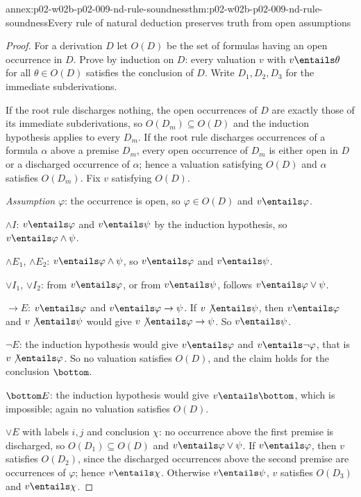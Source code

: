 \begin{annexitem}{annex:p02-w02b-p02-009-nd-rule-soundness}{thm:p02-w02b-p02-009-nd-rule-soundness}{Every rule of natural deduction preserves truth from open assumptions}
\begin{proof}
For a derivation \(D\) let \(O(D)\) be the set of formulas having an open
occurrence in \(D\).  Prove by induction on \(D\): every valuation \(v\) with
\(v\entails\theta\) for all \(\theta\in O(D)\) satisfies the conclusion of
\(D\).  Write \(D_1,D_2,D_3\) for the immediate subderivations.

If the root rule discharges nothing, the open occurrences of \(D\) are
exactly those of its immediate subderivations, so \(O(D_m)\subseteq O(D)\)
and the induction hypothesis applies to every \(D_m\).  If the root rule
discharges occurrences of a formula \(\alpha\) above a premise \(D_m\), every
open occurrence of \(D_m\) is either open in \(D\) or a discharged occurrence
of \(\alpha\); hence a valuation satisfying \(O(D)\) and \(\alpha\) satisfies
\(O(D_m)\).  Fix \(v\) satisfying \(O(D)\).

\emph{Assumption} \(\varphi\): the occurrence is open, so
\(\varphi\in O(D)\) and \(v\entails\varphi\).

\(\land I\): \(v\entails\varphi\) and \(v\entails\psi\) by the induction
hypothesis, so \(v\entails\varphi\land\psi\).

\(\land E_1\), \(\land E_2\): \(v\entails\varphi\land\psi\), so
\(v\entails\varphi\) and \(v\entails\psi\).

\(\lor I_1\), \(\lor I_2\): from \(v\entails\varphi\), or from
\(v\entails\psi\), follows \(v\entails\varphi\lor\psi\).

\(\to E\): \(v\entails\varphi\) and \(v\entails\varphi\to\psi\).  If
\(v\not\entails\psi\), then \(v\entails\varphi\) and \(v\not\entails\psi\)
would give \(v\not\entails\varphi\to\psi\).  So \(v\entails\psi\).

\(\neg E\): the induction hypothesis would give \(v\entails\varphi\) and
\(v\entails\neg\varphi\), that is \(v\not\entails\varphi\).  So no
valuation satisfies \(O(D)\), and the claim holds for the conclusion
\(\bottom\).

\(\bottom E\): the induction hypothesis would give \(v\entails\bottom\),
which is impossible; again no valuation satisfies \(O(D)\).

\(\lor E\) with labels \(i,j\) and conclusion \(\chi\): no occurrence above
the first premise is discharged, so \(O(D_1)\subseteq O(D)\) and
\(v\entails\varphi\lor\psi\).  If \(v\entails\varphi\), then \(v\) satisfies
\(O(D_2)\), since the discharged occurrences above the second premise are
occurrences of \(\varphi\); hence \(v\entails\chi\).  Otherwise
\(v\entails\psi\), \(v\) satisfies \(O(D_3)\) and \(v\entails\chi\).


\end{proof}
\end{annexitem}
